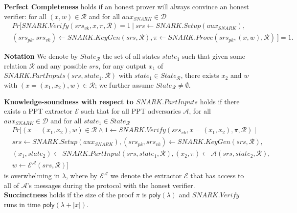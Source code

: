 \begin{definition}
\noindent \textbf{Perfect Completeness} holds if an honest prover will always convince an honest verifier: for all  
$(x,w) \in \mathcal{R}$ and for all $\mathit{aux_{\mathit{SNARK}}} \in \mathcal{D}$
\begin{align*}
& \mathit{Pr}[\mathit{SNARK.Verify}(\mathit{srs_{vk}}, x, \pi, \mathcal{R}) = 1 \ | \  
\mathit{srs} \leftarrow \mathit{SNARK.Setup}(\mathit{aux_{\mathit{SNARK}}}), \\ 
& (\mathit{srs_{pk}}, \mathit{srs_{vk}})\leftarrow \mathit{SNARK.KeyGen}(\mathit{srs}, \mathcal{R}), \pi \leftarrow \mathit{SNARK.Prove}(\mathit{srs_{pk}}, (x,w), \mathcal{R}) \ ] = 1.
\end{align*}

\noindent \textbf{Notation} We denote by $\mathit{State_{\mathcal{R}}}$ the set of all states $\mathit{state}_1$ 
such that given some relation $\mathcal{R}$ and any possible $\mathit{srs}$, 
for any output $x_1$ of  $\mathit{SNARK.PartInputs}(\mathit{srs}, \mathit{state}_1, \mathcal{R})$ 
with $\mathit{state_1} \in \mathit{State_{\mathcal{R}}}$, there exists $x_2$ and $w$ with $(x=(x_1, x_2), w) \in \mathcal{R}$; 
we further assume $\mathit{State_{\mathcal{R}}} \neq \emptyset$.\\
\vspace{-0.08in}

\noindent \textbf{Knowledge-soundness with respect to $\mathit{SNARK.PartInputs}$}
holds if there exists a PPT extractor $\mathcal{E}$ such that for all PPT 
adversaries $\mathcal{A}$, for all $\mathit{aux_{\mathit{SNARK}}} \in \mathcal{D}$ and for all $\mathit{state_1} \in \mathit{State_{\mathcal{R}}}$
\begin{align*}
&\mathit{Pr}[(x = (x_1, x_2), w) \in \mathcal{R} \wedge 1 \leftarrow \mathit{SNARK.Verify}(\mathit{srs_{vk}}, x =  (x_1, x_2), \pi, \mathcal{R}) \ | \\
&\mathit{srs} \leftarrow \mathit{SNARK.Setup}(\mathit{aux_{\mathit{SNARK}}}), (\mathit{srs_{pk}}, \mathit{srs_{vk}})\leftarrow  \mathit{SNARK.KeyGen}(\mathit{srs}, \mathcal{R}), \\ 
& (x_1, \mathit{state}_2) \leftarrow \mathit{SNARK.PartInput}(\mathit{srs}, \mathit{state}_1, \mathcal{R}), (x_2, \pi) \leftarrow \mathcal{A}(\mathit{srs}, \mathit{state}_2, \mathcal{R}), \\
& w \leftarrow \mathcal{E}^{\mathcal{A}}(srs,\mathcal{R})]
\end{align*}
\noindent is overwhelming in $\lambda$, where by $\mathcal{E}^{\mathcal{A}}$ we denote the extractor $\mathcal{E}$ that has access to all of 
$\mathcal{A}$'s messages during the protocol with the honest verifier. \\ 
\noindent \textbf{Succinctness} holds if the size of the proof $\pi$ is $\mathsf{poly}(\lambda)$ and $\mathit{SNARK.Verify}$ runs in time 
$\mathsf{poly}(\lambda + |x|)$. %
\end{definition}
